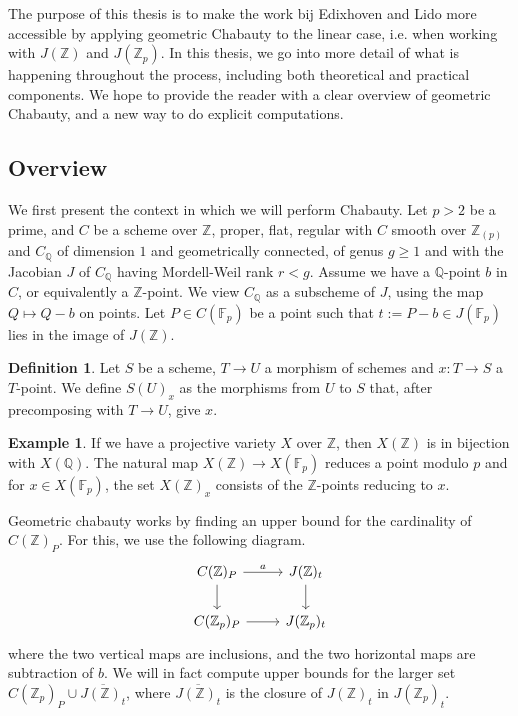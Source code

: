 \documentclass[12pt]{article}
\newcommand{\Z}{\mathbb{Z}}
\newcommand{\Q}{\mathbb{Q}}
\newcommand{\F}{\mathbb{F}}
\theoremstyle{plain}
\theoremstyle{definition}
\newtheorem{defn}[thm]{Definition} %
\newtheorem{exmp}[thm]{Example} %
\theoremstyle{remark}
\begin{document}
The purpose of this thesis is to make the work bij Edixhoven and Lido more accessible by applying geometric Chabauty to the linear case, i.e. when working with $J(\Z)$ and $J(\Z_p)$. In this thesis, we go into more detail of what is happening throughout the process, including both theoretical and practical components. We hope to provide the reader with a clear overview of geometric Chabauty, and a new way to do explicit computations.

\subsection{Overview}
We first present the context in which we will perform Chabauty. Let $p>2$ be a prime, and $C$ be a scheme over $\Z$, proper, flat, regular with $C$ smooth over $\Z_{(p)}$ and $C_\Q$ of dimension $1$ and geometrically connected, of genus $g \geq 1$ and with the Jacobian $J$ of $C_\Q$ having Mordell-Weil rank $r < g$. Assume we have a $\Q$-point $b$ in $C$, or equivalently a $\Z$-point. We view $C_\Q$ as a subscheme of $J$, using the map $Q \mapsto Q - b$ on points. Let $P \in C(\F_p)$ be a point such that $t := P - b \in J(\F_p)$ lies in the image of $J(\Z)$.

\begin{defn}
Let $S$ be a scheme, $T \to U$ a morphism of schemes and $x : T \to S$ a $T$-point. We define $S(U)_x$ as the morphisms from $U$ to $S$ that, after precomposing with $T \to U$, give $x$.
\end{defn}
\begin{exmp}
If we have a projective variety $X$ over $\Z$, then $X(\Z)$ is in bijection with $X(\Q)$. The natural map $X(\Z) \to X(\F_p)$ reduces a point modulo $p$ and for $x \in X(\F_p)$, the set $X(\Z)_x$ consists of the $\Z$-points reducing to $x$.
\end{exmp}

Geometric chabauty works by finding an upper bound for the cardinality of $C(\Z)_P$. For this, we use the following diagram.
\[
\begin{tikzcd}
C(\Z)_P \arrow[d] \arrow[r, "a"] & J(\Z)_t \arrow[d] \\
C(\Z_p)_P \arrow[r]              & J(\Z_p)_t        
\end{tikzcd}
\]
where the two vertical maps are inclusions, and the two horizontal maps are subtraction of $b$. We will in fact compute upper bounds for the larger set $C(\Z_p)_P \cup \overline{J(\Z)_t}$, where $\overline{J(\Z)_t}$ is the closure of $J(\Z)_t$ in $J(\Z_p)_t$. 
\end{document}

